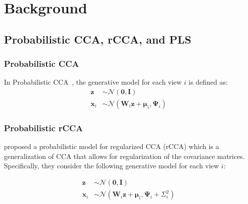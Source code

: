 \section{Background}\label{sec:background}

\subsection{Probabilistic CCA, rCCA, and PLS}\label{subsec:probabilistic-cca-rcca-and-pls}

\subsubsection{Probabilistic CCA}

In Probabilistic CCA~\cite{bach2005probabilistic}, the generative model for each view \(i\) is defined as:
\begin{align}
    \mathbf{z}& \sim \mathcal{N}(\mathbf{0}, \mathbf{I})                                            \\
    \mathbf{x}_i & \sim \mathcal{N}(\mathbf{W}_i \mathbf{z} + \boldsymbol{\mu}_i, \boldsymbol{\Psi}_i)
\end{align}


\subsubsection{Probabilistic rCCA}

\cite{de2003regularization} proposed a probabilistic model for regularized CCA (rCCA) which is a generalization of CCA that allows for regularization of the covariance matrices.
Specifically, they consider the following generative model for each view \(i\):

\begin{align}
    \mathbf{z}& \sim \mathcal{N}(\mathbf{0}, \mathbf{I})                                            \\
    \mathbf{x}_i & \sim \mathcal{N}(\mathbf{W}_i \mathbf{z} + \boldsymbol{\mu}_i, \boldsymbol{\Psi}_i + \Sigma_i^2)
\end{align}

